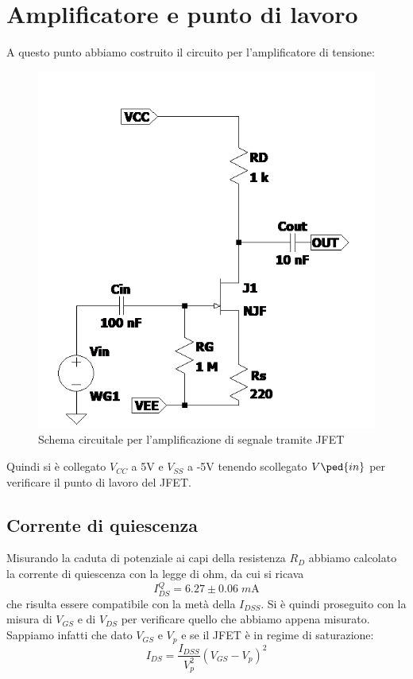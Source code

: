 \documentclass[10pt, a4paper, italian]{article}
\begin{document}
\section{Amplificatore e punto di lavoro}
A questo punto abbiamo costruito il circuito per l'amplificatore di tensione:
\begin{figure}[htbp]
    \centering
	\includegraphics[scale=0.7]{Draft2}
    \caption{Schema circuitale per l'amplificazione di segnale tramite JFET}
\end{figure}
Quindi si è collegato $V_{CC}$ a 5V e $V_{SS}$ a -5V tenendo scollegato $V\ped{in}$ per verificare il punto di lavoro del JFET.

\subsection{Corrente di quiescenza}
Misurando la caduta di potenziale ai capi della resistenza $R_D$ abbiamo calcolato la corrente di quiescenza con la legge di ohm, da cui si ricava
\[
I_{DS}^Q = 6.27 \pm 0.06 \; \si{m\A}
\]
che risulta essere compatibile con la metà della $I_{DSS}$.
Si è quindi proseguito con la misura di $V_{GS}$ e di $V_{DS}$ per verificare quello che abbiamo appena misurato.
Sappiamo infatti che dato $V_{GS}$ e $V_p$ e se il JFET è in regime di saturazione:
\begin{equation}
I_{DS}=\frac{I_{DSS}}{V_p ^2}(V_{GS}-V_p)^2
\end{equation}
\end{document}

